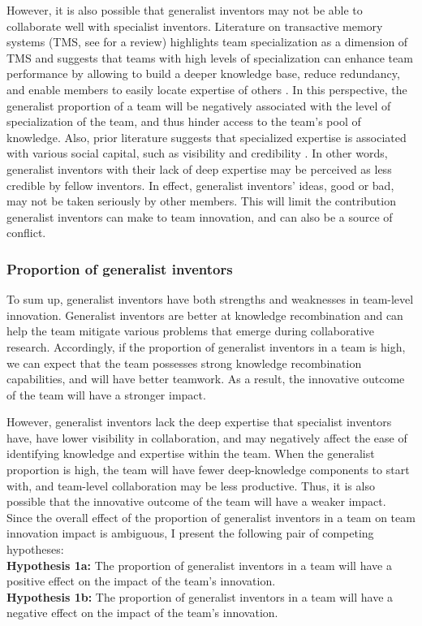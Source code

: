\documentclass{article}
\begin{document}
However, it is also possible that generalist inventors may not be able to collaborate well with specialist inventors. 
Literature on transactive memory systems (TMS, see \textcite{Lewis2011,Ren2011} for a review) highlights team specialization as a dimension of TMS and suggests that teams with high levels of specialization can enhance team performance by allowing to build a deeper knowledge base, reduce redundancy, and enable members to easily locate expertise of others \autocite{Wegner1995,Austin2003,Hollingshead2000}. In this perspective, the generalist proportion of a team will be negatively associated with the level of specialization of the team, and thus hinder access to the team's pool of knowledge.
Also, prior literature suggests that specialized expertise is associated with various social capital, such as visibility \autocite{Leahey2007} and credibility \autocite{Faulkner1998}. In other words, generalist inventors with their lack of deep expertise may be perceived as less credible by fellow inventors. In effect, generalist inventors' ideas, good or bad, may not be taken seriously by other members. This will limit the contribution generalist inventors can make to team innovation, and can also be a source of conflict.

\subsubsection{Proportion of generalist inventors}
To sum up, generalist inventors have both strengths and weaknesses in team-level innovation. Generalist inventors are better at knowledge recombination and can help the team mitigate various problems that emerge during collaborative research. Accordingly, if the proportion of generalist inventors in a team is high, we can expect that the team possesses strong knowledge recombination capabilities, and will have better teamwork. As a result, the innovative outcome of the team will have a stronger impact.

However, generalist inventors lack the deep expertise that specialist inventors have, have lower visibility in collaboration, and may negatively affect the ease of identifying knowledge and expertise within the team. When the generalist proportion is high, the team will have fewer deep-knowledge components to start with, and team-level collaboration may be less productive. Thus, it is also possible that the innovative outcome of the team will have a weaker impact.
Since the overall effect of the proportion of generalist inventors in a team on team innovation impact is ambiguous, I present the following pair of competing hypotheses:\\
\textbf{Hypothesis 1a:} The proportion of generalist inventors in a team will have a positive effect on the impact of the team's innovation.\\
\textbf{Hypothesis 1b:} The proportion of generalist inventors in a team will have a negative effect on the impact of the team's innovation.
\end{document}

